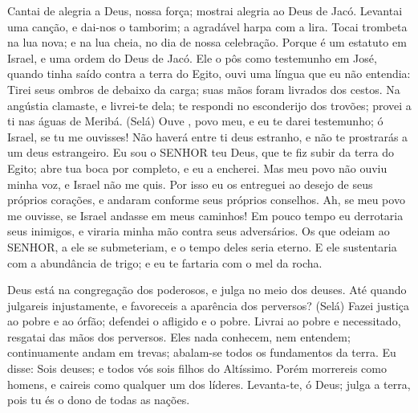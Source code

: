 {\PP 
  Cantai de alegria a Deus,
{} nossa força; mostrai alegria ao Deus de Jacó.
  Levantai uma canção, e dai-nos o tamborim; a agradável harpa com a lira.
  Tocai trombeta na lua nova; e na lua cheia, no dia de nossa celebração.
  Porque
{} é um estatuto em Israel, e uma ordem do Deus de Jacó.
  Ele o pôs como testemunho em José, quando tinha saído contra a terra do Egito,
{} ouvi uma língua que eu não entendia:
  Tirei seus ombros de debaixo da carga; suas mãos foram livrados dos cestos.
  Na angústia clamaste, e livrei-te dela; te respondi no esconderijo dos trovões; provei a ti nas águas de Meribá. (Selá)
  Ouve
{},  povo meu, e eu te darei testemunho; ó Israel, se tu me ouvisses!
  Não haverá entre ti deus estranho, e não te prostrarás a um deus estrangeiro.
  Eu sou o SENHOR teu Deus, que te fiz subir da terra do Egito; abre tua boca por completo, e eu a encherei.
  Mas meu povo não ouviu minha voz, e Israel não me quis.
  Por isso eu os entreguei ao desejo de seus próprios corações, e andaram conforme seus próprios conselhos.
  Ah, se meu povo me ouvisse, se Israel andasse em meus caminhos!
  Em pouco tempo eu derrotaria seus inimigos, e viraria minha mão contra seus adversários.
  Os que odeiam ao SENHOR, a ele se submeteriam, e o tempo
{} deles seria eterno.
  E ele sustentaria
{} com a abundância de trigo; e eu te fartaria com o mel da rocha.
\par }


{\PP 
  Deus está na congregação dos poderosos, e julga no meio dos deuses.
  Até quando julgareis injustamente, e favoreceis a aparência dos perversos? (Selá)
  Fazei justiça ao pobre e ao órfão; defendei o afligido e o pobre.
  Livrai ao pobre e necessitado, resgatai
{} das mãos dos perversos.
  Eles nada conhecem, nem entendem; continuamente andam em trevas; abalam-se todos os fundamentos da terra.
  Eu disse: Sois deuses; e todos vós sois filhos do Altíssimo.
  Porém morrereis como homens, e caireis como qualquer um dos líderes.
  Levanta-te, ó Deus; julga a terra, pois tu és o dono de todas as nações.
\par }


